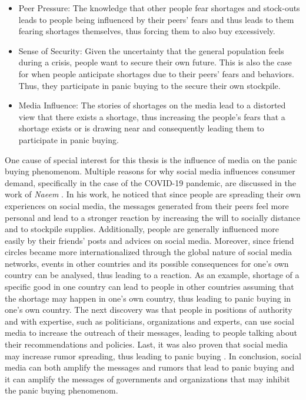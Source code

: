 \begin{itemize}
    \item Peer Pressure: The knowledge that other people fear shortages and 
    stock-outs leads to people being influenced by their peers' fears and thus leads
    to them fearing shortages themselves, thus forcing them to also buy excessively.
    \item Sense of Security: Given the uncertainty that the general population
    feels during a crisis, people want to secure their own future. This is also
    the case for when people anticipate shortages due to their peers' fears 
    and behaviors. Thus, they participate in panic buying to the secure their
    own stockpile.
    \item Media Influence: The stories of shortages on the media
    lead to a distorted view that there exists a shortage, thus increasing 
    the people's fears that a shortage exists or is drawing near and consequently
    leading them to participate in panic buying.
\end{itemize}

One cause of special interest for this thesis is the influence of 
media on the panic buying phenomenom. 
Multiple reasons for why social media influences consumer demand, 
specifically in the case of the COVID-19 pandemic,
are discussed in the work of \textit{Naeem} \cite{naeem2021social}.
In his work, he noticed that since people are spreading their 
own experiences on social media, the messages generated from their peers feel
more personal and lead to a stronger reaction by increasing the will to 
socially distance and to stockpile supplies. Additionally, people are generally
influenced more easily by their friends' posts and advices on social media.
Moreover, since friend circles became more 
internationalized through the global nature of social media networks,
events in other countries and its
possible consequences for one's own country can be analysed, thus
leading to a reaction. As an example,
shortage of a specific good in one country can lead to people in other countries
assuming that the shortage may happen in one's own country, thus leading to 
panic buying in one's own country. 
The next discovery was that people in positions of authority and with expertise,
such as politicians, organizations and experts, can use social media to increase 
the outreach of their messages, leading to people talking about their 
recommendations and policies.
Last, it was also proven that social media may increase rumor spreading,
thus leading to panic buying \cite{naeem2022understanding}.
In conclusion, social media can both amplify the messages and rumors that lead to 
panic buying and it can amplify the messages of governments and organizations 
that may inhibit the panic buying phenomenom.



